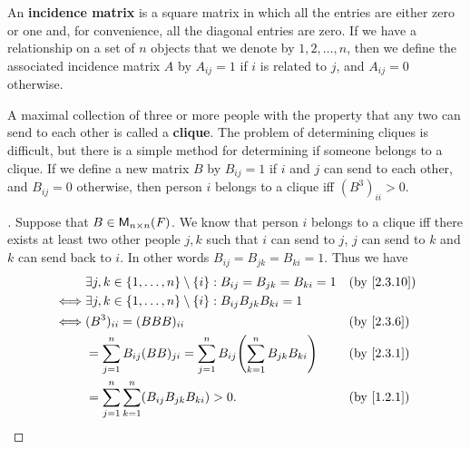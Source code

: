 \begin{defn}\label{2.3.9}
  An \textbf{incidence matrix} is a square matrix in which all the entries are either zero or one and, for convenience, all the diagonal entries are zero.
  If we have a relationship on a set of \(n\) objects that we denote by \(1, 2, \dots, n\), then we define the associated incidence matrix \(A\) by \(A_{i j} = 1\) if \(i\) is related to \(j\), and \(A_{i j} = 0\) otherwise.
\end{defn}

\begin{eg}\label{2.3.10}
  A maximal collection of three or more people with the property that any two can send to each other is called a \textbf{clique}.
  The problem of determining cliques is difficult, but there is a simple method for determining if someone belongs to a clique.
  If we define a new matrix \(B\) by \(B_{i j} = 1\) if \(i\) and \(j\) can send to each other, and \(B_{i j} = 0\) otherwise, then person \(i\) belongs to a clique iff \((B^3)_{i i} > 0\).
\end{eg}

\begin{proof}[]
  Suppose that \(B \in \mathsf{M}_{{n} \times n}({\mathit{F}})\).
  We know that person \(i\) belongs to a clique iff there exists at least two other people \(j, k\) such that \(i\) can send to \(j\), \(j\) can send to \(k\) and \(k\) can send back to \(i\).
  In other words \(B_{i j} = B_{j k} = B_{k i} = 1\).
  Thus we have
  \begin{align*}
         & \exists j, k \in \set{1, \dots, n} \setminus \set{i} : B_{i j} = B_{j k} = B_{k i} = 1           &  & \text{(by \cref{2.3.10})} \\
    \iff & \exists j, k \in \set{1, \dots, n} \setminus \set{i} : B_{i j} B_{j k} B_{k i} = 1                                              \\
    \iff & (B^3)_{i i} = (BBB)_{i i}                                                                        &  & \text{(by \cref{2.3.6})}  \\
         & = \sum_{j = 1}^n B_{i j} (BB)_{j i} = \sum_{j = 1}^n B_{i j} \pa{\sum_{k = 1}^n B_{j k} B_{k i}} &  & \text{(by \cref{2.3.1})}  \\
         & = \sum_{j = 1}^n \sum_{k = 1}^n (B_{i j} B_{j k} B_{k i}) > 0.                                   &  & \text{(by \cref{1.2.1})}
  \end{align*}
\end{proof}

